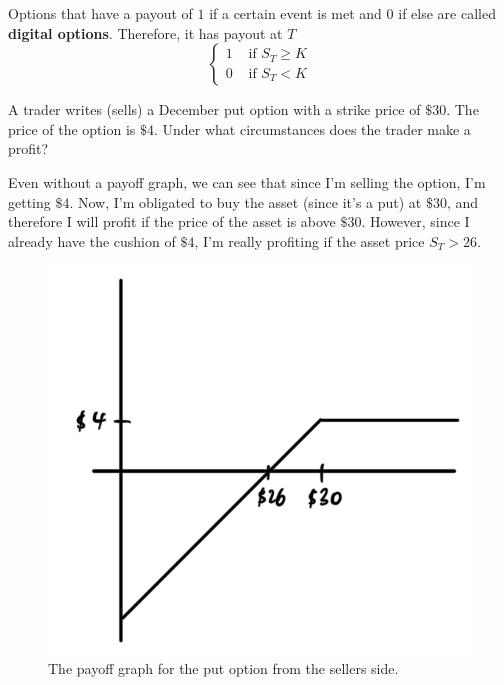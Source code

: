 \documentclass{article}
\begin{document}
      \begin{example}
        Options that have a payout of $1$ if a certain event is met and $0$ if else are called \textbf{digital options}. Therefore, it has payout at $T$ 
        \begin{equation}
          \begin{cases} 
            1 & \text{ if } S_T \geq K \\ 
            0 & \text{ if } S_T < K
          \end{cases} 
        \end{equation}
      \end{example}

      \begin{exercise}[Hull 1.16]
        A trader writes (sells) a December put option with a strike price of $\$30$. The price of the option is $\$4$. Under what circumstances does the trader make a profit? 
      \end{exercise}
      \begin{solution}
        Even without a payoff graph, we can see that since I'm selling the option, I'm getting $\$4$. Now, I'm obligated to buy the asset (since it's a put) at $\$30$, and therefore I will profit if the price of the asset is above $\$30$. However, since I already have the cushion of $\$4$, I'm really profiting if the asset price $S_T > 26$. 
        \begin{figure}[H]
          \centering 
          \includegraphics[scale=0.2]{img/ex1-16.png}
          \caption{The payoff graph for the put option from the sellers side.} 
          \label{fig:ex1-16}
        \end{figure}
      \end{solution}
\end{document}
